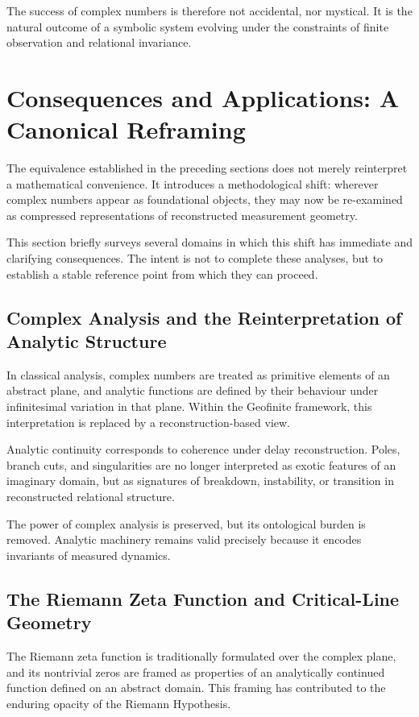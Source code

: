 \documentclass[12pt]{book}  %
\begin{document}
The success of complex numbers is therefore not accidental, nor mystical. It is the natural outcome of a symbolic system evolving under the constraints of finite observation and relational invariance.

\chapter{Consequences and Applications: A Canonical Reframing}

The equivalence established in the preceding sections does not merely reinterpret a mathematical convenience. It introduces a methodological shift: wherever complex numbers appear as foundational objects, they may now be re-examined as compressed representations of reconstructed measurement geometry.

This section briefly surveys several domains in which this shift has immediate and clarifying consequences. The intent is not to complete these analyses, but to establish a stable reference point from which they can proceed.

\section*{Complex Analysis and the Reinterpretation of Analytic Structure}

In classical analysis, complex numbers are treated as primitive elements of an abstract plane, and analytic functions are defined by their behaviour under infinitesimal variation in that plane. Within the Geofinite framework, this interpretation is replaced by a reconstruction-based view.

Analytic continuity corresponds to coherence under delay reconstruction. Poles, branch cuts, and singularities are no longer interpreted as exotic features of an imaginary domain, but as signatures of breakdown, instability, or transition in reconstructed relational structure.

The power of complex analysis is preserved, but its ontological burden is removed. Analytic machinery remains valid precisely because it encodes invariants of measured dynamics.

\section*{The Riemann Zeta Function and Critical-Line Geometry}

The Riemann zeta function is traditionally formulated over the complex plane, and its nontrivial zeros are framed as properties of an analytically continued function defined on an abstract domain. This framing has contributed to the enduring opacity of the Riemann Hypothesis.
\end{document}
